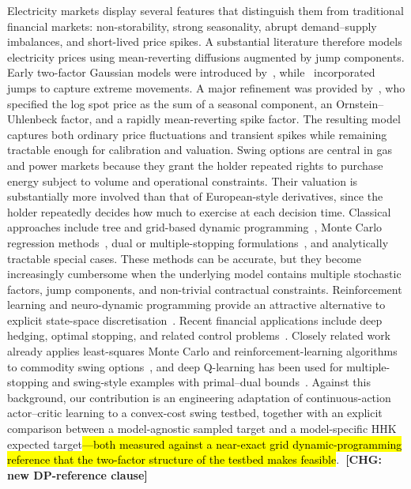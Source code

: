 \documentclass[a4paper,fleqn]{cas-dc}
\newcommand{\hlt}[1]{\hl{#1}}
\newcommand{\hlt}[1]{#1}
\newcommand{\chg}[1]{{\normalfont\bfseries\color{red}~[CHG: \textsf{\footnotesize #1}]~}}
\newcommand{\chg}[1]{}
\begin{document}
Electricity markets display several features that distinguish them from traditional financial markets: non-storability, strong seasonality, abrupt demand--supply imbalances, and short-lived price spikes. A substantial literature therefore models electricity prices using mean-reverting diffusions augmented by jump components. Early two-factor Gaussian models were introduced by~\cite{lucia2002electricity}, while~\cite{cartea2005pricing} incorporated jumps to capture extreme movements. A major refinement was provided by~\cite{Hambly2009}, who specified the log spot price as the sum of a seasonal component, an Ornstein--Uhlenbeck factor, and a rapidly mean-reverting spike factor. The resulting model captures both ordinary price fluctuations and transient spikes while remaining tractable enough for calibration and valuation. Swing options are central in gas and power markets because they grant the holder repeated rights to purchase energy subject to volume and operational constraints. Their valuation is substantially more involved than that of European-style derivatives, since the holder repeatedly decides how much to exercise at each decision time. Classical approaches include tree and grid-based dynamic programming~\cite{jaillet2004valuation}, Monte Carlo regression methods~\cite{longstaff2001valuing,meinshausen2004monte}, dual or multiple-stopping formulations~\cite{carmona2008swing}, and analytically tractable special cases. These methods can be accurate, but they become increasingly cumbersome when the underlying model contains multiple stochastic factors, jump components, and non-trivial contractual constraints. Reinforcement learning and neuro-dynamic programming provide an attractive alternative to explicit state-space discretisation~\cite{bertsekas1996neuro,sutton1998reinforcement}. Recent financial applications include deep hedging, optimal stopping, and related control problems~\cite{halperin2017qlbs,buehler2019deephedging,becker2019deepoptimalstopping,tsoskounoglou2025higherorder}. Closely related work already applies least-squares Monte Carlo and reinforcement-learning algorithms to commodity swing options~\cite{daluiso2020pricingcommodityswing}, and deep Q-learning has been used for multiple-stopping and swing-style examples with primal--dual bounds~\cite{ery2021solvingoptimalstopping}. Against this background, our contribution is an engineering adaptation of continuous-action actor--critic learning to a convex-cost swing testbed, together with an explicit comparison between a model-agnostic sampled target and a model-specific HHK expected target\hlt{---both measured against a near-exact grid dynamic-programming reference that the two-factor structure of the testbed makes feasible}.\chg{new DP-reference clause}
\end{document}
